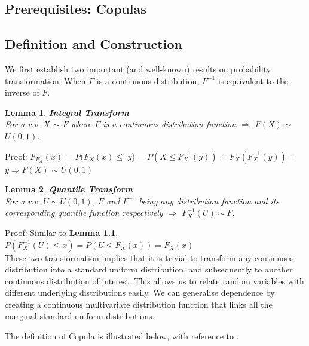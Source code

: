 \documentclass[12pt]{report}
\newtheorem{lemma}{Lemma}[subsection]
\newcommand{\1}{\mathbf{1}}
\begin{document}
\begin{flushleft}
\newpage

\section{Prerequisites: Copulas}
\vspace{0.5cm}
\subsection{Definition and Construction}
\vspace{0.5cm}

We first establish two important (and well-known) results on probability transformation. When $F$ is a continuous distribution, $F^{-1}$ is equivalent to the inverse of $F$.\\


\begin{lemma}\label{IntegralTransform} 
\textbf{Integral Transform} \\

For a r.v. $X$ $\sim$ $F$ where $F$ is a continuous distribution function $\Rightarrow$ $F(X)$ $\sim$ $U(0,1)$.
\end{lemma}
Proof:  \parencite{HofertBook} $F_{F_{X}}(x)$ = $P(F_{X}(x) $$\le$ $y$) = $P(X \le F^{-1}_{X}(y))$ = $F_{X}(F^{-1}_{X}(y))$ = $y \Rightarrow F(X)$ $\sim$ $U(0,1)$ 
\\


\begin{lemma}\label{QuantileTransform}
\textbf{Quantile Transform} \\

For a r.v. $U \sim U(0,1)$, $F$ and $F^{-1}$ being any distribution function and its corresponding quantile function respectively $\Rightarrow$ $F^{-1}_{X}(U) \sim F $.
\end{lemma}
Proof: Similar to \textbf{Lemma 1.1}, $P(F^{-1}_{X}(U) \le x) = P(U \le F_{X}(x)) = F_{X}(x)$
\\

\vspace{0.5cm}
These two transformation implies that it is trivial to transform any continuous distribution into a standard uniform distribution, and subsequently to another continuous distribution of interest. This allows us to relate random variables with different underlying distributions easily. We can generalise dependence by creating a continuous multivariate distribution function that links all the marginal standard uniform distributions. 

\vspace{0.5cm}
The definition of Copula is illustrated below, with reference to \cite{HofertBook}.\\


\end{flushleft}
\end{document}

